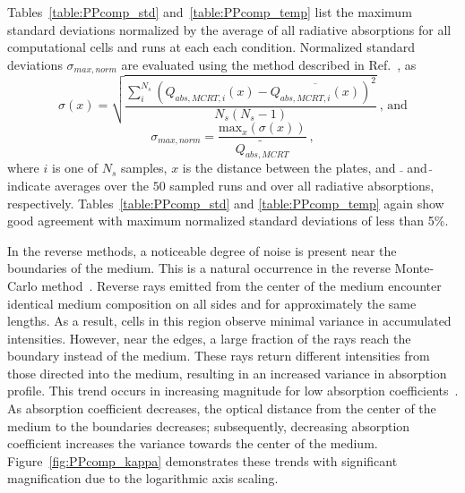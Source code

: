 Tables~\ref{table:PPcomp_std} and~\ref{table:PPcomp_temp} list the maximum standard deviations normalized by the average of all radiative absorptions for all computational cells and runs at each each condition. Normalized standard deviations $\sigma_{max,norm}$ are evaluated using the method described in Ref.~\cite{Modest2022ChapterExchange}, as 
\begin{equation}
    \sigma(x) = \sqrt{\frac{\sum_i^{N_s}{(Q_{abs,MCRT,i}(x)-\overline{Q_{abs,MCRT,i}(x)})^2}}{N_s(N_s-1)}}~\text{, and}
    \label{eq:StandardDeviation}
\end{equation}
\begin{equation}
    \sigma_{max,norm} = \frac{\text{max}_x(\sigma(x))}{\widetilde{Q_{abs,MCRT}}}~,
    \label{eq:StandardDeviationMax}
\end{equation}
where $i$ is one of $N_s$ samples, $x$ is the distance between the plates, and $\bar{~}$ and $\widetilde{~}$ indicate averages over the $50$ sampled runs and over all radiative absorptions, respectively. 
Tables~\ref{table:PPcomp_std} and \ref{table:PPcomp_temp} again show good agreement with maximum normalized standard deviations of less than 5\%.

In the reverse methods, a noticeable degree of noise is present near the boundaries of the medium. This is a natural occurrence in the reverse Monte-Carlo method~\cite{Farmer1998ComparisonMedia}. Reverse rays emitted from the center of the medium encounter identical medium composition on all sides and for approximately the same lengths. As a result, cells in this region observe minimal variance in accumulated intensities. However, near the edges, a large fraction of the rays reach the boundary instead of the medium. These rays return different intensities from those directed into the medium, resulting in an increased variance in absorption profile.
This trend occurs in increasing magnitude for low absorption coefficients~\cite{Farmer1998ComparisonMedia}. As absorption coefficient decreases, the optical distance from the center of the medium to the boundaries decreases; subsequently, decreasing absorption coefficient increases the variance towards the center of the medium. Figure~\ref{fig:PPcomp_kappa} demonstrates these trends with significant magnification due to the logarithmic axis scaling.




